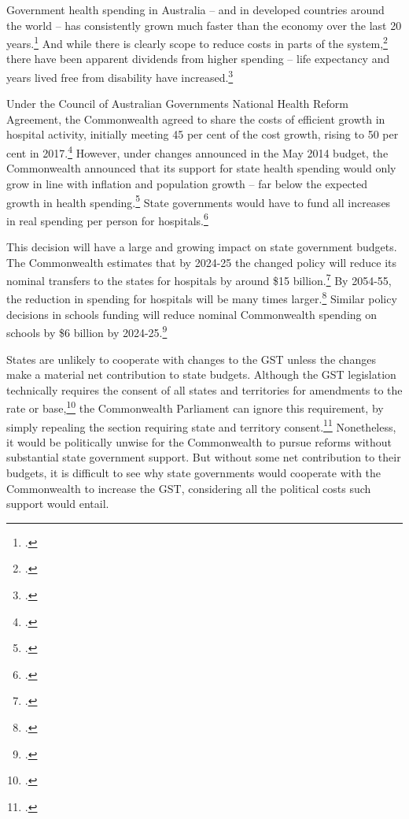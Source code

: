 \documentclass{grattanAlpha}
\begin{document}
Government health spending in Australia – and in developed countries around the world – has consistently grown much faster than the economy over the last 20 years.\footcites[][25--27]{DaleyWoodWeidmannEtAl2014}[][17]{DaleyMcGannonHunter2014}  And while there is clearly scope to reduce costs in parts of the system,\footcites{DuckettBreadonGinnivanEtAl2013}{DuckettBreadonRomanesEtAl2015}  there have been apparent dividends from higher spending – life expectancy and years lived free from disability have increased.\footcite[][16]{Daley2015}  

Under the Council of Australian Governments National Health Reform Agreement, the Commonwealth agreed to share the costs of efficient growth in hospital activity, initially meeting 45 per cent of the cost growth, rising to 50 per cent in 2017.\footcite[][13]{COAG2011}  However, under changes announced in the May 2014 budget, the Commonwealth announced that its support for state health spending would only grow in line with inflation and population growth – far below the expected growth in health spending.\footcite[][28]{DaleyWood2015FiscalChallenges}  State governments would have to fund all increases in real spending per person for hospitals.\footcite[][Budget Paper No.~2, p.~126]{Treasury2014-Budget-Papers-2014-15}  

This decision will have a large and growing impact on state government budgets. The Commonwealth estimates that by 2024-25 the changed policy will reduce its nominal transfers to the states for hospitals by around \$15 billion.\footcite[][115]{SenateEconomicsLegislationCommittee2014}  By 2054-55, the reduction in spending for hospitals will be many times larger.\footcite[][16--18]{DaleyWood2015FiscalChallenges}  Similar policy decisions in schools funding will reduce nominal Commonwealth spending on schools by \$6 billion by 2024-25.\footcite[][115]{SenateEconomicsLegislationCommittee2014}

States are unlikely to cooperate with changes to the GST unless the changes make a material net contribution to state budgets. Although the GST legislation technically requires the consent of all states and territories for amendments to the rate or base,\footcite[][\S11]{GST-Act-Rate-Base-1999}  the Commonwealth Parliament can ignore this requirement, by simply repealing the section requiring state and territory consent.\footcite{Twomey2003}  Nonetheless, it would be politically unwise for the Commonwealth to pursue reforms without substantial state government support. But without some net contribution to their budgets, it is difficult to see why state governments would cooperate with the Commonwealth to increase the GST, considering all the political costs such support would entail. 
\end{document}
